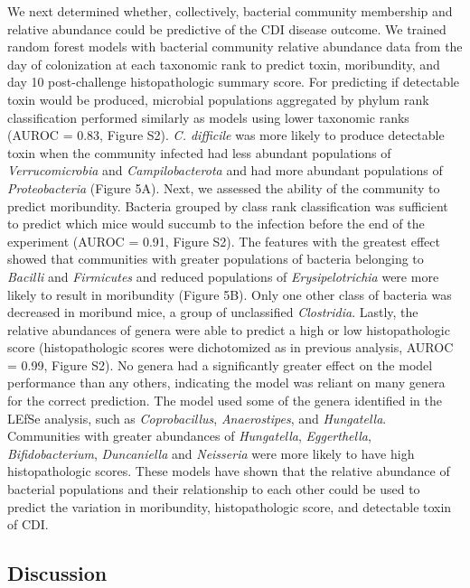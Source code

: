 \documentclass[
  12pt,
]{article}
\begin{document}
We next determined whether, collectively, bacterial community membership
and relative abundance could be predictive of the CDI disease outcome.
We trained random forest models with bacterial community relative
abundance data from the day of colonization at each taxonomic rank to
predict toxin, moribundity, and day 10 post-challenge histopathologic
summary score. For predicting if detectable toxin would be produced,
microbial populations aggregated by phylum rank classification performed
similarly as models using lower taxonomic ranks (AUROC = 0.83, Figure
S2). \emph{C. difficile} was more likely to produce detectable toxin
when the community infected had less abundant populations of
\emph{Verrucomicrobia} and \emph{Campilobacterota} and had more abundant
populations of \emph{Proteobacteria} (Figure 5A). Next, we assessed the
ability of the community to predict moribundity. Bacteria grouped by
class rank classification was sufficient to predict which mice would
succumb to the infection before the end of the experiment (AUROC = 0.91,
Figure S2). The features with the greatest effect showed that
communities with greater populations of bacteria belonging to
\emph{Bacilli} and \emph{Firmicutes} and reduced populations of
\emph{Erysipelotrichia} were more likely to result in moribundity
(Figure 5B). Only one other class of bacteria was decreased in moribund
mice, a group of unclassified \emph{Clostridia}. Lastly, the relative
abundances of genera were able to predict a high or low histopathologic
score (histopathologic scores were dichotomized as in previous analysis,
AUROC = 0.99, Figure S2). No genera had a significantly greater effect
on the model performance than any others, indicating the model was
reliant on many genera for the correct prediction. The model used some
of the genera identified in the LEfSe analysis, such as
\emph{Coprobacillus}, \emph{Anaerostipes}, and \emph{Hungatella}.
Communities with greater abundances of \emph{Hungatella},
\emph{Eggerthella}, \emph{Bifidobacterium}, \emph{Duncaniella} and
\emph{Neisseria} were more likely to have high histopathologic scores.
These models have shown that the relative abundance of bacterial
populations and their relationship to each other could be used to
predict the variation in moribundity, histopathologic score, and
detectable toxin of CDI.

\hypertarget{discussion}{%
\subsection{Discussion}\label{discussion}}
\end{document}
